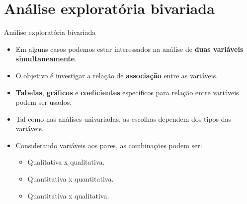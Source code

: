 \documentclass[
  ignorenonframetext,
  serif,
  professionalfont,
  usenames,
  dvipsnames,
  aspectratio = 169]{beamer}
\providecommand{\tightlist}{%
  \setlength{\itemsep}{0pt}\setlength{\parskip}{0pt}}
\renewcommand{\tightlist}{%
  \setlength{\itemsep}{0\baselineskip}
  \setlength{\parskip}{0.25\baselineskip}
}
\def\beginAHalfColumn{\begin{minipage}{0.49\textwidth}}%
\def\endColumns{\end{minipage}}%
\begin{document}
\section{Análise exploratória
bivariada}\label{anuxe1lise-exploratuxf3ria-bivariada}

\begin{frame}{Análise exploratória bivariada}
\label{anuxe1lise-exploratuxf3ria-bivariada-1}
\beginAHalfColumn

\begin{itemize}
\tightlist
\item
  Em alguns casos podemos estar interessados na análise de
  \textbf{duas variáveis simultaneamente}.
\end{itemize}

\vspace{0.3cm}

\begin{itemize}
\tightlist
\item
  O objetivo é investigar a relação de \textbf{associação} entre as
  variáveis.
\end{itemize}

\vspace{0.3cm}

\begin{itemize}
\tightlist
\item
  \textbf{Tabelas}, \textbf{gráficos} e \textbf{coeficientes}
  específicos para relação entre variáveis podem ser usados.
\end{itemize}

\endColumns
\beginAHalfColumn

\begin{itemize}
\tightlist
\item
  Tal como nas análises univariadas, as escolhas dependem dos tipos das
  variáveis.
\end{itemize}

\vspace{0.3 cm}

\begin{itemize}
\tightlist
\item
  Considerando variáveis aos pares, as combinações podem ser:

  \begin{itemize}
  \tightlist
  \item
    Qualitativa x qualitativa.
  \item
    Quantitativa x quantitativa.
  \item
    Quantitativa x qualitativa.
  \end{itemize}
\end{itemize}

\endColumns
\end{frame}
\end{document}
